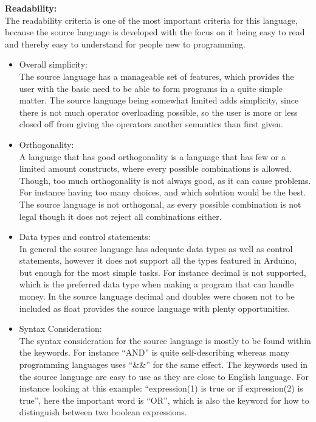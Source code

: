 \textbf{Readability:} \\
The readability criteria is one of the most important criteria for this language, because the source language is developed with the focus on it being easy to read and thereby easy to understand for people new to programming. \\
\begin{itemize}
\item Overall simplicity:\\
The source language has a manageable set of features, which provides the user with the basic need to be able to form programs in a quite simple matter. The source language being somewhat limited adds simplicity, since there is not much operator overloading possible, so the user is more or less closed off from giving the operators another semantics than first given. 
\item Orthogonality:\\
A language that has good orthogonality is a language that has few or a limited amount constructs, where every possible combinations is allowed. Though, too much orthogonality is not always good, as it can cause problems. For instance having too many choices, and which solution would be the best.\\
The source language is not orthogonal, as every possible combination is not legal though it does not reject all combinations either.  
\item Data types and control statements:\\
In general the source language has adequate data types as well as control statements, however it does not support all the types featured in Arduino, but enough for the most simple tasks. For instance decimal is not supported, which is the preferred data type when making a program that can handle money. In the source language decimal and doubles were chosen not to be included as float provides the source language with plenty opportunities.
\item Syntax Consideration:\\
The syntax consideration for the source language is mostly to be found within the keywords. For instance ``AND'' is quite self-describing whereas many programming languages uses ``\&\&'' for the same effect. The keywords used in the source language are easy to use as they are close to English language. For instance looking at this example: ``expression(1) is true or if expression(2) is true'', here the important word is ``OR'', which is also the keyword for how to distinguish between two boolean expressions.
\end{itemize}
